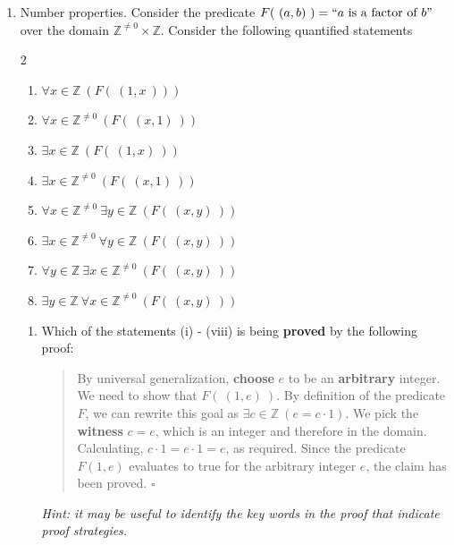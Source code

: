 \begin{enumerate}[labelindent=0pt, leftmargin=0pt]    
    
    \item Number properties. Consider the predicate  $F(~(a,b)~)  = ``a \text{ is a factor of } b"$ 
    over  the domain $\mathbb{Z}^{\neq 0} \times \mathbb{Z}$. Consider the following quantified
    statements
    \begin{multicols}{2}
    \begin{enumerate}[label=(\roman*)]
    \item $\forall x \in \mathbb{Z} ~(F(~(1,x~)))$
    \item $\forall x \in \mathbb{Z}^{\neq 0} ~(F(~(x,1)~))$
    \item $\exists x \in \mathbb{Z} ~(F(~(1,x)~))$
    \item $\exists x \in \mathbb{Z}^{\neq 0} ~(F(~(x,1)~))$
    \item $\forall x \in \mathbb{Z}^{\neq 0} ~\exists y \in \mathbb{Z} ~(F(~(x,y)~))$
    \item $\exists x \in \mathbb{Z}^{\neq 0} ~\forall y \in \mathbb{Z} ~(F(~(x,y)~))$
    \item $\forall y \in \mathbb{Z} ~\exists x \in \mathbb{Z}^{\neq 0} ~(F(~(x,y)~))$
    \item $\exists y \in \mathbb{Z} ~\forall x \in \mathbb{Z}^{\neq 0} ~(F(~(x,y)~))$
    \end{enumerate}
    \end{multicols}
    
    \begin{enumerate}
    
    \item
    Which of the statements (i) - (viii) is being {\bf proved} by the following proof:
    
    \begin{quote}
      By universal generalization, {\bf choose} $e$ to be an {\bf arbitrary} integer. 
      We need to show that $F(~(1,e)~)$. By definition of the  predicate $F$, we can rewrite 
      this goal as $\exists c \in \mathbb{Z}~(e = c \cdot 1)$. We pick the {\bf witness} $c = e$, 
      which is an integer and therefore in the domain. Calculating, 
      $c \cdot 1 = e \cdot 1 = e$, as required. Since the predicate $F(1,e)$ evaluates to true 
      for the arbitrary integer $e$, the claim has been proved. $\square$
    \end{quote}
    
    
    {\it Hint: it may be useful to 
    identify the key words in the proof that indicate proof strategies.}
    

\end{enumerate}
\end{enumerate}
